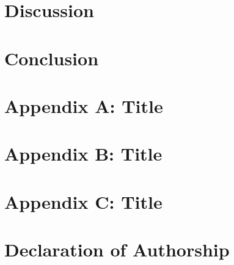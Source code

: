 \documentclass{thesis}
\begin{document}
\chapter{Discussion}\label{ch:discussion}


\chapter{Conclusion}\label{ch:conclusion}


\printbibliography[title=References, heading=bibintoc]

\appendix

\chapter{Appendix A: Title}\label{ch:appendix-a}


\chapter{Appendix B: Title}\label{ch:appendix-b}


\chapter{Appendix C: Title}\label{ch:appendix-c}


\chapter*{Declaration of Authorship}\label{ch:declaration-of-authorship}

\end{document}
